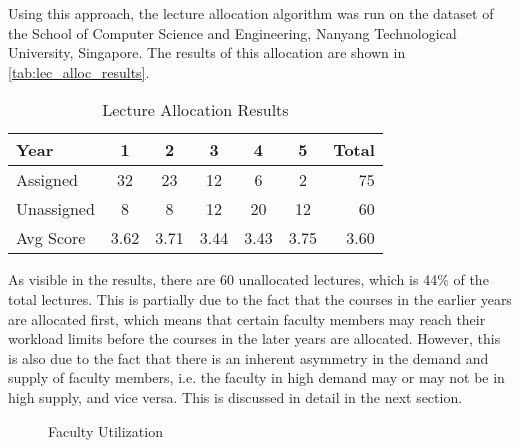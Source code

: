 Using this approach, the lecture allocation algorithm was run on the dataset of the School of Computer Science and Engineering, Nanyang Technological University, Singapore. The results of this allocation are shown in \autoref{tab:lec_alloc_results}.

\begin{table}[H]
  \centering
  \begin{tabular}{|l|c|c|c|c|c|r|}
    \hline
    \textbf{Year} & \textbf{1} & \textbf{2} & \textbf{3} & \textbf{4} & \textbf{5} & \textbf{Total} \\ \hline
    Assigned      & 32         & 23         & 12         & 6          & 2          & 75             \\ \hline
    Unassigned    & 8          & 8          & 12         & 20         & 12         & 60             \\ \hline
    Avg Score     & 3.62       & 3.71       & 3.44       & 3.43       & 3.75       & 3.60           \\ \hline
  \end{tabular}
  \caption{Lecture Allocation Results}
  \label{tab:lec_alloc_results}
\end{table}

As visible in the results, there are 60 unallocated lectures, which is 44\% of the total lectures. This is partially due to the fact that the courses in the earlier years are allocated first, which means that certain faculty members may reach their workload limits before the courses in the later years are allocated. However, this is also due to the fact that there is an inherent asymmetry in the demand and supply of faculty members, i.e. the faculty in high demand may or may not be in high supply, and vice versa. This is discussed in detail in the next section.

\begin{figure}[H]
  \centering
  \caption{Faculty Utilization}
  \label{fig:faculty_utilization}
\end{figure}

